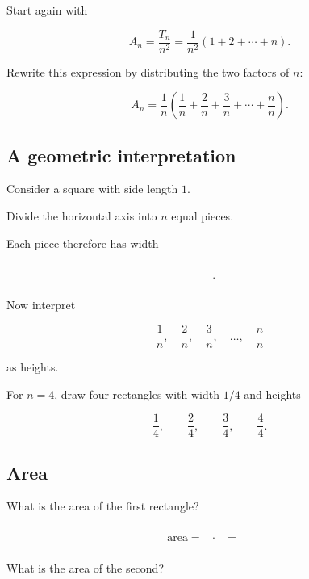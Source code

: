 \documentclass[11pt]{article}
\begin{document}
Start again with

\[
A_n
=
\frac{T_n}{n^2}
=
\frac{1}{n^2}
\left(
1+2+\cdots+n
\right).
\]

Rewrite this expression by distributing the two factors of \(n\):

\[
A_n
=
\frac1n
\left(
\frac1n
+
\frac2n
+
\frac3n
+
\cdots
+
\frac nn
\right).
\]


\subsection*{A geometric interpretation}

Consider a square with side length \(1\).

Divide the horizontal axis into \(n\) equal pieces.

Each piece therefore has width

\[
\boxed{\phantom{\frac{1}{n}}}.
\]

Now interpret

\[
\frac1n,\quad
\frac2n,\quad
\frac3n,\quad
\ldots,\quad
\frac nn
\]

as heights.


\begin{center}
\end{center}


For \(n=4\), draw four rectangles with width \(1/4\) and heights

\[
\frac14,\qquad
\frac24,\qquad
\frac34,\qquad
\frac44.
\]


\subsection*{Area}

What is the area of the first rectangle?

\[
\text{area}
=
\boxed{\phantom{\frac14}}
\cdot
\boxed{\phantom{\frac14}}
=
\boxed{\phantom{\frac1{16}}}
\]

What is the area of the second?
\end{document}
